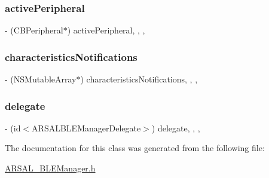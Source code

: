 \subsubsection{\texorpdfstring{active\+Peripheral}{activePeripheral}}
{\footnotesize\ttfamily -\/ (C\+B\+Peripheral$\ast$) active\+Peripheral\hspace{0.3cm}{\ttfamily [read]}, {\ttfamily [write]}, {\ttfamily [nonatomic]}, {\ttfamily [retain]}}

\hypertarget{interfaceARSAL__BLEManager_ae326962fee96bf58f374fb7d4f3d2260}{}\label{interfaceARSAL__BLEManager_ae326962fee96bf58f374fb7d4f3d2260} 
\subsubsection{\texorpdfstring{characteristics\+Notifications}{characteristicsNotifications}}
{\footnotesize\ttfamily -\/ (N\+S\+Mutable\+Array$\ast$) characteristics\+Notifications\hspace{0.3cm}{\ttfamily [read]}, {\ttfamily [write]}, {\ttfamily [nonatomic]}, {\ttfamily [retain]}}

\hypertarget{interfaceARSAL__BLEManager_aead3a29e0e0fc9a1dff3bb3f9474dca3}{}\label{interfaceARSAL__BLEManager_aead3a29e0e0fc9a1dff3bb3f9474dca3} 
\subsubsection{\texorpdfstring{delegate}{delegate}}
{\footnotesize\ttfamily -\/ (id$<$A\+R\+S\+A\+L\+B\+L\+E\+Manager\+Delegate$>$) delegate\hspace{0.3cm}{\ttfamily [read]}, {\ttfamily [write]}, {\ttfamily [nonatomic]}, {\ttfamily [assign]}}



The documentation for this class was generated from the following file\+:\begin{DoxyCompactItemize}
\item 
\hyperlink{ARSAL__BLEManager_8h}{A\+R\+S\+A\+L\+\_\+\+B\+L\+E\+Manager.\+h}\end{DoxyCompactItemize}
